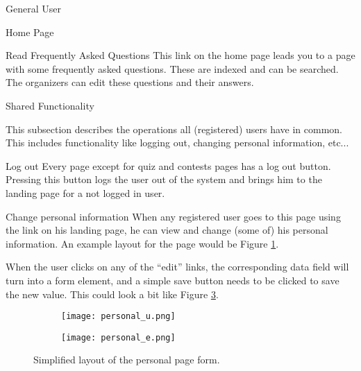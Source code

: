 \begin{section}{General User}
\begin{subsection}{Home Page}
        \begin{subsubsection}{Read Frequently Asked Questions}
            This link on the home page leads you to a page with some frequently
            asked questions. These are indexed and can be searched. The
            organizers can edit these questions and their answers.
        \end{subsubsection}

    \end{subsection}

    \begin{subsection}{Shared Functionality}

        This subsection describes the operations all (registered) users have in
        common. This includes functionality like logging out, changing personal
        information, etc...

        \begin{subsubsection}{Log out}
            Every page except for quiz and contests pages has a log out button.
            Pressing this button logs the user out of the system and brings him
            to the landing page for a not logged in user.
        \end{subsubsection}

        \begin{subsubsection}{Change personal information}
            When any registered user goes to this page using the link on his
            landing page, he can view and change (some of) his personal
            information. An example layout for the page would be Figure
            \ref{img:personal}.

            When the user clicks on any of the ``edit'' links, the corresponding
            data field will turn into a form element, and a simple save button
            needs to be clicked to save the new value. This could look a bit
            like Figure \ref{img:personal_edit}.

            \begin{figure}[h]
                \centering
                \begin{subfigure}{0.7\textwidth}
                    \texttt{[image: personal\_u.png]}
                    \label{img:personal}
                \end{subfigure}

                \begin{subfigure}{0.7\textwidth}
                    \texttt{[image: personal\_e.png]}
                    \label{img:personal_edit}
                \end{subfigure}
                \caption{Simplified layout of the personal page form.}
            \end{figure}
        \end{subsubsection}


\end{subsection}
\end{section}
